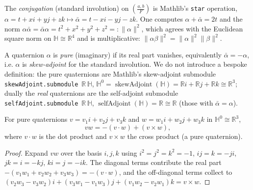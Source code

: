 The \emph{conjugation} (standard involution) on $\left(\frac{a,b}{F}\right)$ is
Mathlib's \texttt{star} operation,
$\alpha = t + xi + yj + zk \mapsto \bar\alpha = t - xi - yj - zk$.
One computes $\alpha + \bar\alpha = 2t$ and the norm
$\alpha\bar\alpha = \bar\alpha\alpha = t^2 + x^2 + y^2 + z^2 =: \lVert\alpha\rVert^2$,
which agrees with the Euclidean square norm on $\mathbb{H} \cong \mathbb{R}^4$ and
is multiplicative: $\lVert\alpha\beta\rVert^2 = \lVert\alpha\rVert^2\lVert\beta\rVert^2$.

A quaternion $\alpha$ is \emph{pure} (imaginary) if its real part vanishes,
equivalently $\bar\alpha = -\alpha$, i.e. $\alpha$ is \emph{skew-adjoint} for the
standard involution. We do not introduce a bespoke definition: the pure
quaternions are Mathlib's skew-adjoint submodule
\texttt{skewAdjoint.submodule}~$\mathbb{R}\,\mathbb{H}$,
$\mathbb{H}^0 = \operatorname{skewAdjoint}(\mathbb{H})
= \mathbb{R}i + \mathbb{R}j + \mathbb{R}k \cong \mathbb{R}^3$; dually the
\emph{real} quaternions are the self-adjoint submodule
\texttt{selfAdjoint.submodule}~$\mathbb{R}\,\mathbb{H}$,
$\operatorname{selfAdjoint}(\mathbb{H}) = \mathbb{R} \cong \mathbb{R}$ (those with
$\bar\alpha = \alpha$).

\begin{lemma}
    \label{lem:pure-product}
    \leanok
    For pure quaternions $v = v_1 i + v_2 j + v_3 k$ and
    $w = w_1 i + w_2 j + w_3 k$ in $\mathbb{H}^0 \cong \mathbb{R}^3$,
    \[
      vw = -(v \cdot w) + (v \times w),
    \]
    where $v\cdot w$ is the dot product and $v \times w$ the cross product (a pure
    quaternion).
\end{lemma}
\begin{proof}
    Expand $vw$ over the basis $i, j, k$ using $i^2 = j^2 = k^2 = -1$,
    $ij = k = -ji$, $jk = i = -kj$, $ki = j = -ik$. The diagonal terms contribute
    the real part $-(v_1 w_1 + v_2 w_2 + v_3 w_3) = -(v\cdot w)$, and the
    off-diagonal terms collect to
    $(v_2 w_3 - v_3 w_2)i + (v_3 w_1 - v_1 w_3)j + (v_1 w_2 - v_2 w_1)k = v\times w$.
\end{proof}

